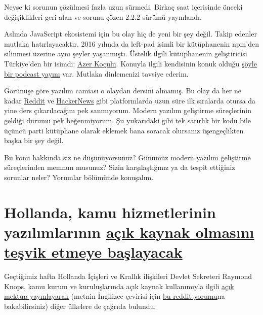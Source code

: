 \documentclass[11pt]{article}
\begin{document}
Neyse ki sorunun çözülmesi fazla uzun sürmedi. Birkaç saat içerisinde önceki
değişiklikleri geri alan ve sorunu çözen 2.2.2 sürümü yayınlandı.

Aslında JavaScript ekosistemi için bu olay hiç de yeni bir şey değil. Takip
edenler mutlaka hatırlayacaktır. 2016 yılında da left-pad isimli bir
kütüphanenin npm'den silinmesi üzerine aynı şeyler yaşanmıştı. Üstelik ilgili
kütüphanenin geliştiricisi Türkiye'den bir isimdi: \href{https://kodfabrik.com/}{Azer Koçulu}. Konuyla ilgili
kendisinin konuk olduğu \href{https://podtail.com/en/podcast/devpod/-036-azer-koculu/}{şöyle bir podcast yayını} var. Mutlaka dinlemenizi
tavsiye ederim.

Görünüşe göre yazılım camiası o olaydan dersini almamış. Bu olay da her ne
kadar \href{https://www.reddit.com/r/programming/comments/g7xweu/another\_1liner\_npm\_package\_broke\_the\_js\_ecosystem/}{Reddit} ve \href{https://news.ycombinator.com/item?id=22979245}{HackerNews} gibi platformlarda uzun süre ilk sıralarda otursa
da yine ders çıkarılacağını pek sanmıyorum. Modern yazılım geliştirme
süreçlerinin geldiği durumu pek beğenmiyorum. Şu yukarıdaki gibi tek satırlık
bir kodu bile üçüncü parti kütüphane olarak eklemek bana soracak olursanız
üşengeçlikten başka bir şey değil.

Bu konu hakkında siz ne düşünüyorsunuz? Günümüz modern yazılım geliştirme
süreçlerinden memnun musunuz? Sizin karşılaştığınız ya da tespit ettiğiniz
sorunlar neler? Yorumlar bölümünde konuşalım.
\section{Hollanda, kamu hizmetlerinin yazılımlarının \href{https://joinup.ec.europa.eu/collection/open-source-observatory-osor/news/legal-barrier-be-removed}{açık kaynak olmasını teşvik etmeye başlayacak}}
\label{sec:org3099054}
Geçtiğimiz hafta Hollanda İçişleri ve Krallık ilişkileri Devlet Sekreteri
Raymond Knops, kamu kurum ve kuruluşlarında açık kaynak kullanımıyla ilgili
\href{https://www.rijksoverheid.nl/documenten/kamerstukken/2020/04/17/kamerbrief-inzake-vrijgeven-broncode-overheidssoftware}{açık mektup yayınlayarak} (metnin İngilizce çevirisi için \href{https://www.reddit.com/r/freesoftware/comments/g77202/netherlands\_commits\_to\_free\_software\_by\_default/fogpeub/}{bu reddit yorumu}na
bakabilirsiniz) diğer ülkelere de çağrıda bulundu.
\end{document}
